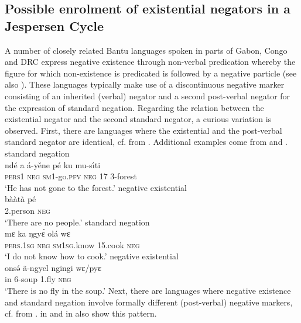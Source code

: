 \documentclass[output=paper]{langsci/langscibook}
\begin{document}
\subsection{Possible enrolment of existential negators in a Jespersen Cycle}\label{sec:1:6.3}
%
A number of closely related Bantu languages spoken in parts of Gabon, Congo and DRC express negative existence through non-verbal predication whereby the figure for which non-existence is predicated is followed by a negative particle (see also ). These languages typically make use of a discontinuous negative marker consisting of an inherited (verbal) negator and a second post-verbal negator for the expression of standard negation. Regarding the relation between the existential negator and the second standard negator, a curious variation is observed. First, there are languages where the existential and the post-verbal standard negator are identical, cf.  from . Additional examples come from   and  .
%
\ea\label{ex:iyaa-forest-people}
%
\ea standard negation\\
\gll nd\'e a {\'a}-yěne p\'e ku mu-s{\'\i}ti\\
	\textsc{pers}1 \textsc{neg} \textsc{sm}1-go.\textsc{pfv} \textsc{neg} 17 3-forest\\
\glt 	`He has not gone to the forest.'
\ex negative existential\\
\gll b{\`a\`a}t\`a p\'e\\
	2.person \textsc{neg}\\
\glt 	`There are no people.'
\z\z
%
\ea\label{ex:engungwel-cook-fly}
%
\ea standard negation\\
\gll mɛ ka ŋgy\'ɛ ol\'a wɛ\\
	\textsc{pers.1sg} \textsc{neg} \textsc{sm1sg}.know 15.cook \textsc{neg}\\
\glt 	`I do not know how to cook.'
%
\ex negative existential\\
\gll ons\'ə {\~a}-ngyel ngingi wɛ/pyɛ\footnotemark\\
	in 6-soup 1.fly \textsc{neg}\\
\glt 	`There is no fly in the soup.'
\z\z
%
Next, there are languages where negative existence and standard negation involve formally different (post-verbal) negative markers, cf.  from .  in  and  in  also show this pattern.
\end{document}
